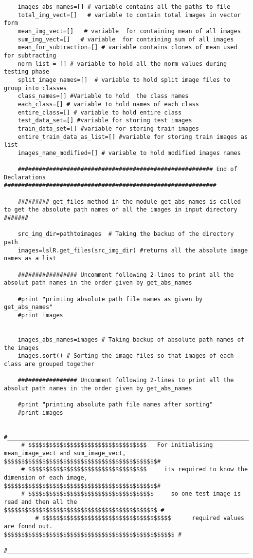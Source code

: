 \documentclass[10pt,a4paper]{article}
\begin{document}
\begin{lstlisting}
	images_abs_names=[] # variable contains all the paths to file
	total_img_vect=[]   # variable to contain total images in vector form
	mean_img_vect=[]   # variable  for containing mean of all images
	sum_img_vect=[]   # variable  for containing sum of all images
	mean_for_subtraction=[] # variable contains clones of mean used for subtracting
	norm_list = [] # variable to hold all the norm values during testing phase
	split_image_names=[]  # variable to hold split image files to group into classes
	class_names=[] #Variable to hold  the class names
	each_class=[] # variable to hold names of each class
	entire_class=[] # variable to hold entire class
	test_data_set=[] #variable for storing test images
	train_data_set=[] #variable for storing train images
	entire_train_data_as_list=[] #variable for storing train images as list
	images_name_modified=[] # variable to hold modified images names

	######################################################## End of Declarations  #############################################################

	######### get_files method in the module get_abs_names is called to get the absolute path names of all the images in input directory #######

	src_img_dir=pathtoimages  # Taking the backup of the directory path
	images=lslR.get_files(src_img_dir) #returns all the absolute image names as a list   

	################# Uncomment following 2-lines to print all the absolut path names in the order given by get_abs_names
	
	#print "printing absolute path file names as given by get_abs_names"
	#print images


	images_abs_names=images # Taking backup of absolute path names of the images 
	images.sort() # Sorting the image files so that images of each class are grouped together

	################# Uncomment following 2-lines to print all the absolut path names in the order given by get_abs_names

	#print "printing absolute path file names after sorting"
	#print images
	
	#_________________________________________________________________________________________________________________________________________#	
	 # $$$$$$$$$$$$$$$$$$$$$$$$$$$$$$$$$$   For initialising mean_image_vect and sum_image_vect, $$$$$$$$$$$$$$$$$$$$$$$$$$$$$$$$$$$$$$$$$$$$#
	 # $$$$$$$$$$$$$$$$$$$$$$$$$$$$$$$$$$     its required to know the dimension of each image,  $$$$$$$$$$$$$$$$$$$$$$$$$$$$$$$$$$$$$$$$$$$$#
	 # $$$$$$$$$$$$$$$$$$$$$$$$$$$$$$$$$$$$     so one test image is read and then all the      $$$$$$$$$$$$$$$$$$$$$$$$$$$$$$$$$$$$$$$$$$$$ #
         # $$$$$$$$$$$$$$$$$$$$$$$$$$$$$$$$$$$$$      required values are found out.           $$$$$$$$$$$$$$$$$$$$$$$$$$$$$$$$$$$$$$$$$$$$$$$$$ #
	#_________________________________________________________________________________________________________________________________________#


\end{lstlisting}
\end{document}
